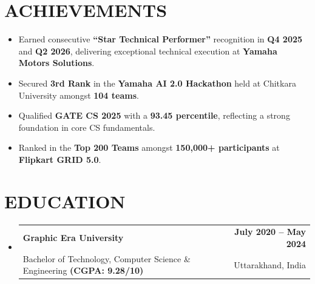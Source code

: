\documentclass[letterpaper,10pt]{article}
\makeatletter
\renewcommand{\normalsize}{%
  \fontsize{10.1}{12.25}\selectfont
}
\newcommand{\resumeItem}[1]{
  \item\normalsize{
    {#1}
  }
}
\newcommand{\resumeSubheading}[4]{
  \item
    \begin{tabular*}{1.0\textwidth}[t]{l@{\extracolsep{\fill}}r}
      \textbf{\normalsize#1} & \textbf{\normalsize#2} \\
      {\normalsize#3} & {\normalsize#4} \\
    \end{tabular*}\vspace{1pt}
}
\newcommand{\resumeSubHeadingListStart}{\begin{itemize}[leftmargin=0.0in, label={}, itemsep=6pt, topsep=2pt]}
\newcommand{\resumeSubHeadingListEnd}{\end{itemize}}
\newcommand{\resumeItemListStart}{\begin{itemize}}
\newcommand{\resumeItemListEnd}{\end{itemize}\vspace{-3pt}}
\makeatother
\begin{document}
\section{ACHIEVEMENTS}
  \resumeItemListStart
    \resumeItem{Earned consecutive \textbf{``Star Technical Performer''} recognition in \textbf{Q4 2025} and \textbf{Q2 2026}, delivering exceptional technical execution at \textbf{Yamaha Motors Solutions}.}
    \resumeItem{Secured \textbf{3rd Rank} in the \textbf{Yamaha AI 2.0 Hackathon} held at Chitkara University amongst \textbf{104 teams}.}
    \resumeItem{Qualified \textbf{GATE CS 2025} with a \textbf{93.45 percentile}, reflecting a strong foundation in core CS fundamentals.}
    \resumeItem{Ranked in the \textbf{Top 200 Teams} amongst \textbf{150,000+ participants} at \textbf{Flipkart GRID 5.0}.}
  \resumeItemListEnd

\section{EDUCATION}
  \resumeSubHeadingListStart
    \resumeSubheading
      {Graphic Era University}{July 2020 -- May 2024}
      {Bachelor of Technology, Computer Science \& Engineering \textbf{(CGPA: 9.28/10)}}{Uttarakhand, India}
  \resumeSubHeadingListEnd
\end{document}
